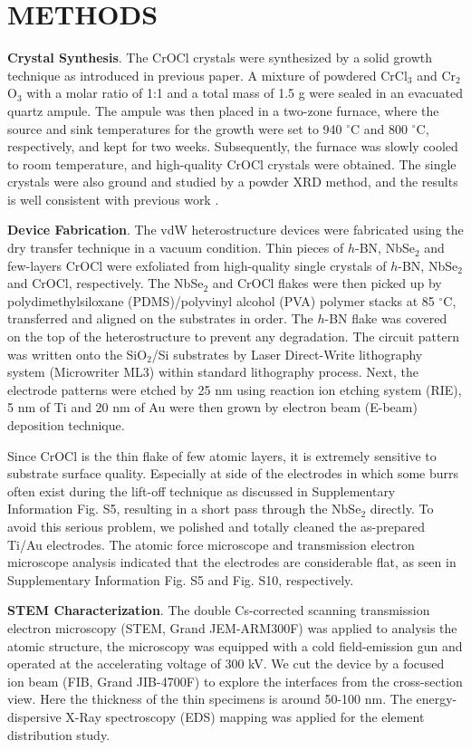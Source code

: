 \documentclass[%
 reprint,
superscriptaddress,
 amsmath,amssymb,
 aps,
]{revtex4-2}
\begin{document}
\section{METHODS}

\textbf{Crystal Synthesis}. The CrOCl crystals were synthesized by a solid growth technique as introduced in previous paper\cite{CrOCl}. A mixture of powdered CrCl$_3$ and Cr$_2$O$_3$ with a molar ratio of 1:1 and a total mass of 1.5 g were sealed in an evacuated quartz ampule. The ampule was then placed in a two-zone furnace, where the source and sink temperatures for the growth were set to 940 $^{\circ}$C and 800 $^{\circ}$C, respectively, and kept for two weeks. Subsequently, the furnace was slowly cooled to room temperature, and high-quality CrOCl crystals were obtained. The single crystals were also ground and studied by a powder XRD method, and the results is well consistent with previous work \cite{CrOCl}.

\textbf{Device Fabrication}. The vdW heterostructure devices were fabricated using the dry transfer technique in a vacuum condition. Thin pieces of $h$-BN, NbSe$_2$ and few-layers CrOCl were exfoliated from high-quality single crystals of $h$-BN, NbSe$_2$ and CrOCl, respectively. The NbSe$_2$ and CrOCl flakes were then picked up by polydimethylsiloxane (PDMS)/polyvinyl alcohol (PVA) polymer stacks at 85 $^{\circ}$C, transferred and aligned on the substrates in order. The $h$-BN flake was covered on the top of the heterostructure to prevent any degradation. The circuit pattern was written onto the SiO$_2$/Si substrates by Laser Direct-Write lithography system (Microwriter ML3) within standard lithography process. Next, the electrode patterns were etched by 25 nm using reaction ion etching system (RIE),  5 nm of Ti and 20 nm of Au were then grown by electron beam (E-beam) deposition technique.

Since CrOCl is the thin flake of few atomic layers, it is extremely sensitive to substrate surface quality. Especially at side of the electrodes in which some burrs often exist during the lift-off technique as discussed in Supplementary Information Fig. S5, resulting in a short pass through the NbSe$_2$ directly. To avoid this serious problem, we polished and totally cleaned the as-prepared Ti/Au electrodes. The atomic force microscope and transmission electron microscope analysis indicated that the electrodes are considerable flat, as seen in Supplementary Information Fig. S5 and Fig. S10, respectively.

\textbf{STEM Characterization}. The double Cs-corrected scanning transmission electron microscopy (STEM, Grand JEM-ARM300F) was applied to analysis the atomic structure, the microscopy was equipped with a cold field-emission gun and operated at the accelerating voltage of 300 kV. We cut the device by a focused ion beam (FIB, Grand JIB-4700F) to explore the interfaces from the cross-section view. Here the thickness of the thin specimens is around 50-100 nm. The energy-dispersive X-Ray spectroscopy (EDS) mapping was applied for the element distribution study.
\end{document}
